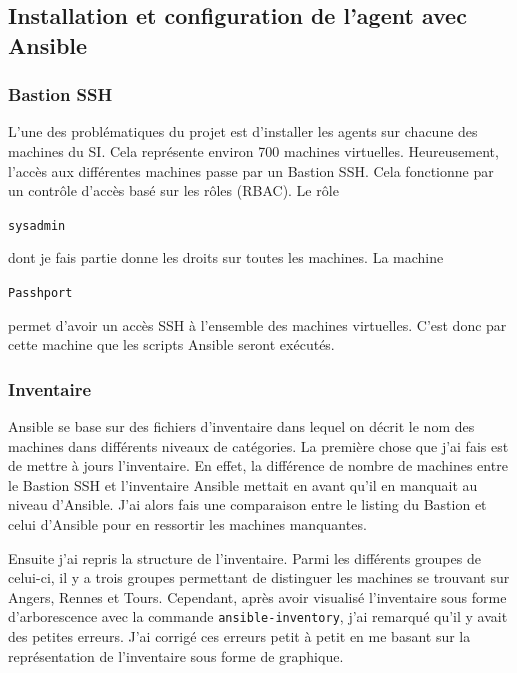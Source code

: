 \documentclass[12pt]{article}
\begin{document}
\subsection{Installation et configuration de l'agent avec Ansible}
\subsubsection{Bastion SSH}
L'une des problématiques du projet est d'installer les agents sur chacune des machines du \gls{SI}. 
Cela représente environ 700 machines virtuelles. 
Heureusement, l'accès aux différentes machines passe par un Bastion SSH. 
Cela fonctionne par un contrôle d'accès basé sur les rôles (\gls{RBAC}). 
Le rôle \begin{code}\texttt{sysadmin}\end{code} dont je fais partie donne les droits sur toutes les machines. 
La machine \begin{code}\texttt{Passhport}\end{code} permet d'avoir un accès SSH à l'ensemble des machines virtuelles.
C'est donc par cette machine que les scripts \gls{Ansible} seront exécutés.

\subsubsection{Inventaire}
\gls{Ansible} se base sur des fichiers d'inventaire dans lequel on décrit le nom des machines dans différents niveaux de catégories. 
La première chose que j'ai fais est de mettre à jours l'inventaire. 
En effet, la différence de nombre de machines entre le Bastion SSH et l'inventaire \gls{Ansible} mettait en avant qu'il en manquait au niveau d'\gls{Ansible}. 
J'ai alors fais une comparaison entre le listing du Bastion et celui d'\gls{Ansible} pour en ressortir les machines manquantes.

Ensuite j'ai repris la structure de l'inventaire. 
Parmi les différents groupes de celui-ci, il y a trois groupes permettant de distinguer les machines se trouvant sur Angers, Rennes et Tours. 
Cependant, après avoir visualisé l'inventaire sous forme d'arborescence avec la commande \verb|ansible-inventory|, j'ai remarqué qu'il y avait des petites erreurs. 
J'ai corrigé ces erreurs petit à petit en me basant sur la représentation de l'inventaire sous forme de graphique.
\end{document}
